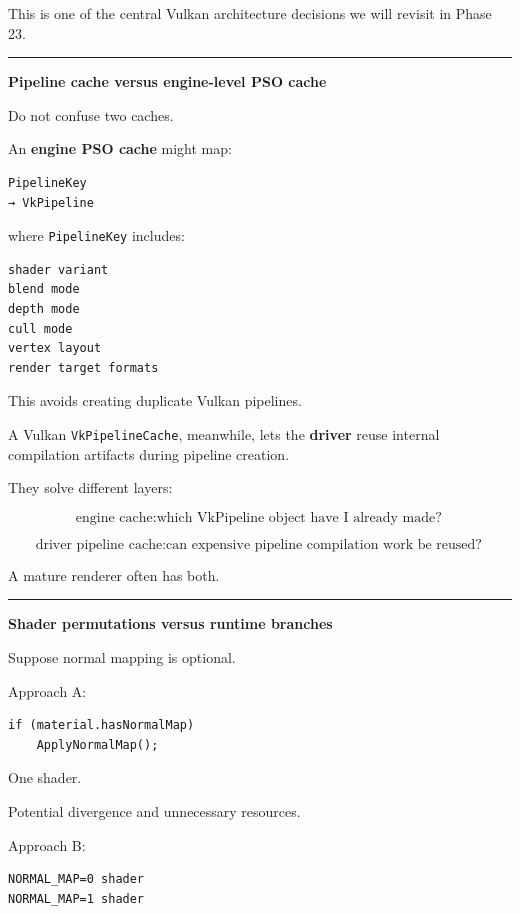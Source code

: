 This is one of the central Vulkan architecture decisions we will revisit in Phase 23.

\begin{center}\rule{0.5\linewidth}{0.5pt}\end{center}

\textbf{Pipeline cache versus engine-level PSO cache}

Do not confuse two caches.

An \textbf{engine PSO cache} might map:

\begin{verbatim}
PipelineKey
→ VkPipeline
\end{verbatim}

where \texttt{PipelineKey} includes:

\begin{verbatim}
shader variant
blend mode
depth mode
cull mode
vertex layout
render target formats
\end{verbatim}

This avoids creating duplicate Vulkan pipelines.

A Vulkan \texttt{VkPipelineCache}, meanwhile, lets the \textbf{driver} reuse internal compilation artifacts during pipeline creation.

They solve different layers:

\[
\boxed{
\text{engine cache}
:
\text{which VkPipeline object have I already made?}
}
\]

\[
\boxed{
\text{driver pipeline cache}
:
\text{can expensive pipeline compilation work be reused?}
}
\]

A mature renderer often has both.

\begin{center}\rule{0.5\linewidth}{0.5pt}\end{center}

\textbf{Shader permutations versus runtime branches}

Suppose normal mapping is optional.

Approach A:

\begin{verbatim}
if (material.hasNormalMap)
    ApplyNormalMap();
\end{verbatim}

One shader.

Potential divergence and unnecessary resources.

Approach B:

\begin{verbatim}
NORMAL_MAP=0 shader
NORMAL_MAP=1 shader
\end{verbatim}

